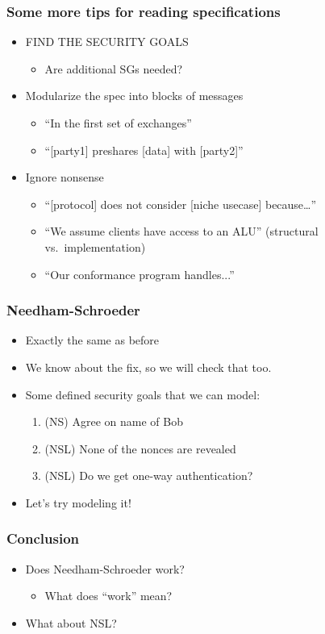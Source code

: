\documentclass[red]{beamer}
\begin{document}
\begin{frame}\frametitle{Some more tips for reading specifications}

\begin{itemize}
\item FIND THE SECURITY GOALS
\begin{itemize}
\item Are additional SGs needed?
\end{itemize}
\item Modularize the spec into blocks of messages
\begin{itemize}
\item ``In the first set of exchanges''
\item ``[party1] preshares [data] with [party2]''
\end{itemize}
\item Ignore nonsense
\begin{itemize}
\item ``[protocol] does not consider [niche usecase] because\dots''
\item ``We assume clients have access to an ALU'' (structural vs.\ implementation)
\item ``Our conformance program handles...''
\end{itemize}
\end{itemize}
\end{frame}

\begin{frame}\frametitle{Needham-Schroeder}
\begin{itemize}
\item Exactly the same as before
\pause
\item We know about the fix, so we will check that too.
\pause 
\item Some defined security goals that we can model:
\begin{enumerate}
\pause
\item (NS) Agree on name of Bob
\pause
\item (NSL) None of the nonces are revealed
\pause
\item (NSL) Do we get one-way authentication?
\end{enumerate}
\pause
\item Let's try modeling it!
\end{itemize}
\end{frame}

\begin{frame}\frametitle{Conclusion}
\begin{itemize}
\pause
\item Does Needham-Schroeder work?
\pause
\begin{itemize}
\item What does ``work'' mean?
\end{itemize}
\pause
\item What about NSL?
\pause
\end{itemize}
\end{frame}



\end{document}

